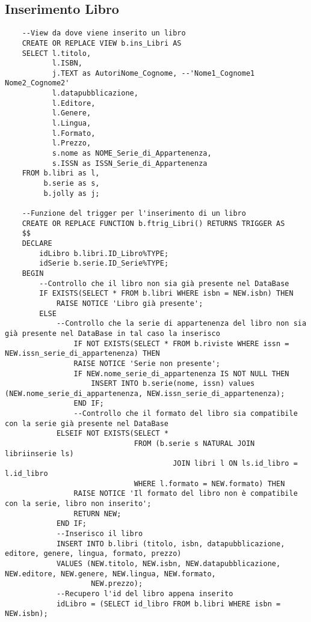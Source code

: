 \subsection{Inserimento Libro}
\begin{lstlisting}
    --View da dove viene inserito un libro
    CREATE OR REPLACE VIEW b.ins_Libri AS
    SELECT l.titolo,
           l.ISBN,
           j.TEXT as AutoriNome_Cognome, --'Nome1_Cognome1 Nome2_Cognome2'
           l.datapubblicazione,
           l.Editore,
           l.Genere,
           l.Lingua,
           l.Formato,
           l.Prezzo,
           s.nome as NOME_Serie_di_Appartenenza,
           s.ISSN as ISSN_Serie_di_Appartenenza
    FROM b.libri as l,
         b.serie as s,
         b.jolly as j;
    
    --Funzione del trigger per l'inserimento di un libro
    CREATE OR REPLACE FUNCTION b.ftrig_Libri() RETURNS TRIGGER AS
    $$
    DECLARE
        idLibro b.libri.ID_Libro%TYPE;
        idSerie b.serie.ID_Serie%TYPE;
    BEGIN
        --Controllo che il libro non sia già presente nel DataBase
        IF EXISTS(SELECT * FROM b.libri WHERE isbn = NEW.isbn) THEN
            RAISE NOTICE 'Libro già presente';
        ELSE
            --Controllo che la serie di appartenenza del libro non sia già presente nel DataBase in tal caso la inserisco
                IF NOT EXISTS(SELECT * FROM b.riviste WHERE issn = NEW.issn_serie_di_appartenenza) THEN
                RAISE NOTICE 'Serie non presente';
                IF NEW.nome_serie_di_appartenenza IS NOT NULL THEN
                    INSERT INTO b.serie(nome, issn) values (NEW.nome_serie_di_appartenenza, NEW.issn_serie_di_appartenenza);
                END IF;
                --Controllo che il formato del libro sia compatibile con la serie già presente nel DataBase
            ELSEIF NOT EXISTS(SELECT *
                              FROM (b.serie s NATURAL JOIN libriinserie ls)
                                       JOIN libri l ON ls.id_libro = l.id_libro
                              WHERE l.formato = NEW.formato) THEN
                RAISE NOTICE 'Il formato del libro non è compatibile con la serie, libro non inserito';
                RETURN NEW;
            END IF;
            --Inserisco il libro
            INSERT INTO b.libri (titolo, isbn, datapubblicazione, editore, genere, lingua, formato, prezzo)
            VALUES (NEW.titolo, NEW.isbn, NEW.datapubblicazione, NEW.editore, NEW.genere, NEW.lingua, NEW.formato,
                    NEW.prezzo);
            --Recupero l'id del libro appena inserito
            idLibro = (SELECT id_libro FROM b.libri WHERE isbn = NEW.isbn);
    

\end{lstlisting}
